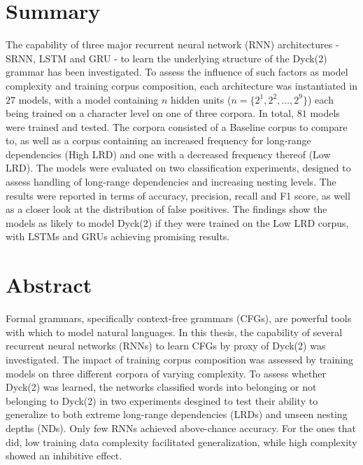 \section*{Summary}
The capability of three major recurrent neural network (RNN) architectures - SRNN, LSTM and GRU - to learn the underlying structure of the Dyck(2) grammar has been investigated. To assess the influence of such factors as model complexity and training corpus composition, each architecture was instantiated in $27$ models, with a model containing $n$ hidden units ($n = \lbrace 2^{1}, 2^{2}, \dots, 2^{9} \rbrace$) each being trained on a character level on one of three corpora. In total, $81$ models were trained and tested. The corpora consisted of a Baseline corpus to compare to, as well as a corpus containing an increased frequency for long-range dependencies (High LRD) and one with a decreased frequency thereof (Low LRD). The models were evaluated on two classification experiments, designed to assess handling of long-range dependencies and increasing nesting levels. The results were reported in terms of accuracy, precision, recall and F1 score, as well as a closer look at the distribution of false positives. The findings show the models as likely to model Dyck(2) if they were trained on the Low LRD corpus, with LSTMs and GRUs achieving promising results.

\section*{Abstract}
Formal grammars, specifically context-free grammars (CFGs), are powerful tools with which to model natural languages. In this thesis, the capability of several recurrent neural networks (RNNs) to learn CFGs by proxy of Dyck(2) was investigated. The impact of training corpus composition was assessed by training models on three different corpora of varying complexity. To assess whether Dyck(2) was learned, the networks classified words into belonging or not belonging to Dyck(2) in two experiments desgined to test their ability to generalize to both extreme long-range dependencies (LRDs) and unseen nesting depths (NDs). Only few RNNs achieved above-chance accuracy. For the ones that did, low training data complexity facilitated generalization, while high complexity showed an inhibitive effect.